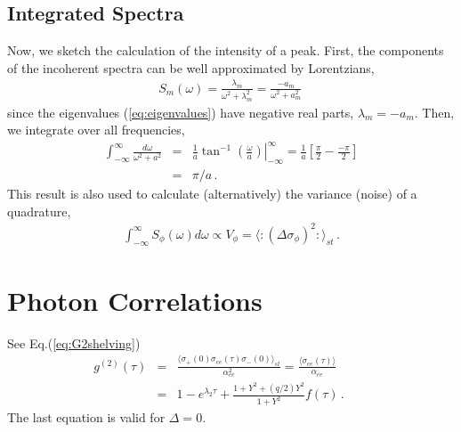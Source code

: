 \documentclass[twocolumn,aps,eqsecnum,showkeys,amsmath]{revtex4-2}
\begin{document}
\subsection{Integrated Spectra} 
Now, we sketch the calculation of the intensity of a peak. First, the 
components of the incoherent spectra can be well approximated by 
Lorentzians, 
%
\begin{eqnarray} 
S_m(\omega) = \frac{\lambda_m}{\omega^2 +\lambda_m^2} 
	= \frac{- a_m}{\omega^2 +a_m^2} 	\,
\end{eqnarray}
since the eigenvalues (\ref{eq:eigenvalues}) have negative real parts, 
$\lambda_m = -a_m$. Then, we integrate over all frequencies, 
%
\begin{eqnarray} 
\int_{-\infty}^{\infty} \frac{d\omega}{\omega^2 +a^2} 
	&=& \left. \frac{1}{a} \tan^{-1}{\left( \frac{\omega}{a} \right)} 
		\right|_{-\infty}^{\infty} 
	=  \frac{1}{a} \left[ \frac{\pi}{2} -\frac{-\pi}{2} \right] 	\nonumber \\ 
	&=& \pi/a	\,.
\end{eqnarray}
This result is also used to calculate (alternatively) the variance (noise) 
of a quadrature,  
%
\begin{eqnarray} 
\int_{-\infty}^{\infty} S_{\phi}(\omega) d \omega \propto V_{\phi} 
	= \langle : (\Delta \sigma_{\phi})^2 :  \rangle_{st} 	\,. 
\end{eqnarray}


\section{Photon Correlations} 
See Eq.(\ref{eq:G2shelving})
%
\begin{eqnarray} 
g^{(2)} (\tau) &=& \frac{\langle \sigma_{+}(0)  \sigma_{ee} (\tau) 
 	\sigma_{-}(0) \rangle_{st}}{\alpha_{ee}^2} 
	= \frac{\langle \sigma_{ee} (\tau) \rangle}{\alpha_{ee}} 	\\
&=& 1- e^{\lambda_2 \tau} +\frac{ 1+ Y^2 +(q/2)Y^2 }{1+ Y^2} f(\tau)  \,.
	\nonumber \qquad
\end{eqnarray}
The last equation is valid for $\Delta=0$. 
\end{document}
